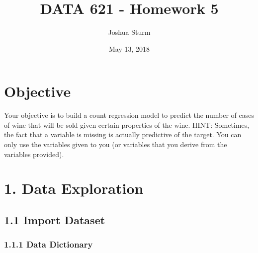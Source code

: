 \documentclass[]{article}
\title{DATA 621 - Homework 5}
\author{Joshua Sturm}
\date{May 13, 2018}
\begin{document}
\maketitle

\hypertarget{objective}{%
\section{Objective}\label{objective}}

Your objective is to build a count regression model to predict the
number of cases of wine that will be sold given certain properties of
the wine. HINT: Sometimes, the fact that a variable is missing is
actually predictive of the target. You can only use the variables given
to you (or variables that you derive from the variables provided).

\hypertarget{data-exploration}{%
\section{1. Data Exploration}\label{data-exploration}}

\hypertarget{import-dataset}{%
\subsection{1.1 Import Dataset}\label{import-dataset}}

\hypertarget{data-dictionary}{%
\subsubsection{1.1.1 Data Dictionary}\label{data-dictionary}}
\end{document}
